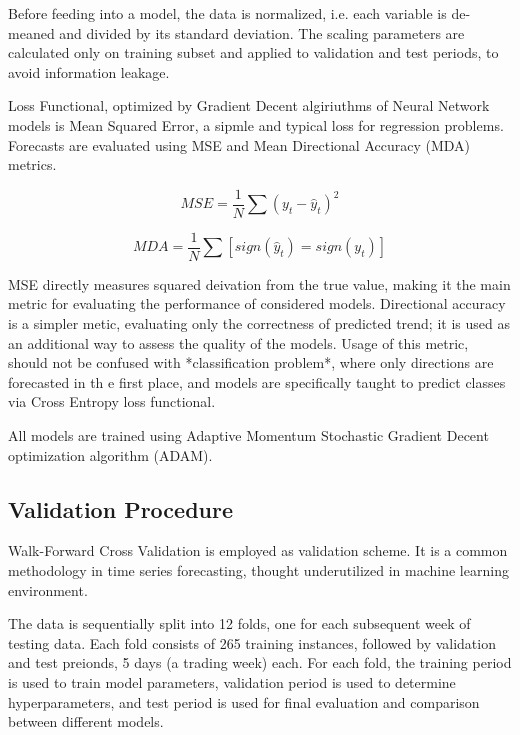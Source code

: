 \documentclass[stu]{apa7}
\begin{document}
Before feeding into a model, the data is normalized, i.e. each variable is de-meaned and divided by its standard deviation. The scaling parameters are calculated only on training subset and applied to validation and test periods, to avoid information leakage.

Loss Functional, optimized by Gradient Decent algiriuthms of Neural Network models is Mean Squared Error, a sipmle and typical loss for regression problems. Forecasts are evaluated using MSE and Mean Directional Accuracy (MDA) metrics.

\begin{equation}
MSE = \frac{1}{N} \sum (y_t - \hat{y}_t)^2
\end{equation}

\begin{equation}
MDA = \frac{1}{N} \sum [ sign(\hat{y}_t)=sign(y_t) ]
\end{equation}

MSE directly measures squared deivation from the true value, making it the main metric for evaluating the performance of considered models. Directional accuracy is a simpler metic, evaluating only the correctness of predicted trend; it is used as an additional way to assess the quality of the models. Usage of this metric, should not be confused with *classification problem*, where only directions are forecasted in th e first place, and models are specifically taught to predict classes via Cross Entropy loss functional.

All models are trained using Adaptive Momentum Stochastic Gradient Decent optimization algorithm (ADAM).

\subsection{Validation Procedure}

Walk-Forward Cross Validation is employed as validation scheme. It is a common methodology in time series forecasting, thought underutilized in machine learning environment.

The data is sequentially split into 12 folds, one for each subsequent week of testing data. Each fold consists of 265 training instances, followed by validation and test preionds, 5 days (a trading week) each. For each fold, the training period is used to train model parameters, validation period is used to determine hyperparameters, and test period is used for final evaluation and comparison between different models.
\end{document}
